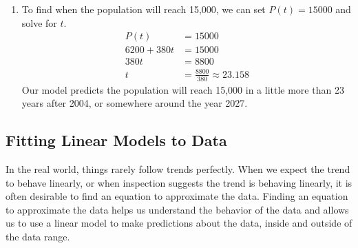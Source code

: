 \begin{example}
\begin{solution}
\begin{enumerate}[label={\alph*)}]
  \item To find when the population will reach 15,000, we can set $P(t) = 15000$ and solve for $t$.
\begin{align*}
  P(t) &= 15000 \\
  6200 +380t &= 15000 \\
  380 t &= 8800 \\
  t &= \frac{8800}{380} \approx 23.158
\end{align*}
Our model predicts the population will reach 15,000 in a little more than 23 years after 2004, or somewhere around the year 2027.
\end{enumerate}
\end{solution}\end{example}

\subsection{Fitting Linear Models to Data}
\label{ssec:linear-models-data}

In the real world, things rarely follow trends perfectly. When we expect the trend to behave linearly, or when inspection suggests the trend is behaving linearly, it is often desirable to find an equation to approximate the data. Finding an equation to approximate the data helps us understand the behavior of the data and allows us to use a linear model to make predictions about the data, inside and outside of the data range.

